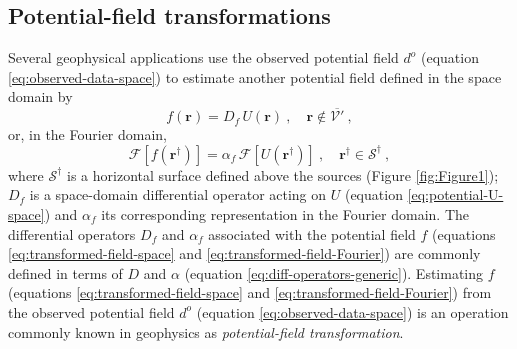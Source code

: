 \subsection{Potential-field transformations}
\label{subsec:potential_field_transformations}

Several geophysical applications use the observed potential field 
$d^{o}$ (equation \ref{eq:observed-data-space}) to estimate another potential field 
defined in the space domain by
\begin{equation}
	f(\mathbf{r}) = D_{f} \, U(\mathbf{r}) \: , 
	\quad \mathbf{r} \notin \overline{\mathcal{V}'} \: ,
	\label{eq:transformed-field-space}
\end{equation}
or, in the Fourier domain, 
\begin{equation}
	\mathcal{F} [ f(\mathbf{r}^{\dagger}) ] =
	\alpha_{f} \, \mathcal{F} [ U(\mathbf{r}^{\dagger}) ] \: ,
	\quad \mathbf{r}^{\dagger} \in \mathcal{S}^{\dagger} \: ,
	\label{eq:transformed-field-Fourier}
\end{equation}
where $\mathcal{S}^{\dagger}$ is a horizontal surface defined above the sources (Figure \ref{fig:Figure1});
$D_{f}$ is a space-domain differential operator acting on $U$ (equation \ref{eq:potential-U-space}) and
$\alpha_{f}$ its corresponding representation in the Fourier domain.
The differential operators $D_{f}$ and $\alpha_{f}$ associated with the potential field 
$f$ (equations \ref{eq:transformed-field-space} and \ref{eq:transformed-field-Fourier}) are commonly
defined in terms of $D$ and $\alpha$ (equation \ref{eq:diff-operators-generic}). 
Estimating $f$ (equations \ref{eq:transformed-field-space} and \ref{eq:transformed-field-Fourier}) from 
the observed potential field $d^{o}$ (equation \ref{eq:observed-data-space}) is an operation 
commonly known in geophysics as \textit{potential-field transformation}.

